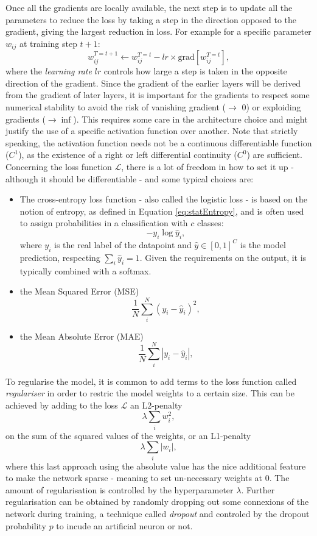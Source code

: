 Once all the gradients are locally available, the next step is to update all the parameters to reduce the loss by taking a step in the direction opposed to the gradient, giving the largest reduction in loss. For example for a specific parameter $w_{ij}$ at training step $t+1$:
\begin{equation}\label{eq:gradientdescent}
    w^{T=t+1}_{ij} \leftarrow w^{T=t}_{ij} - lr \times \text{grad}\left[w^{T=t}_{ij}\right],
\end{equation}
where the \textit{learning rate} $lr$ controls how large a step is taken in the opposite direction of the gradient. Since the gradient of the earlier layers will be derived from the gradient of later layers, it is important for the gradients to respect some numerical stability to avoid the risk of vanishing gradient ($\rightarrow$ 0) or exploiding gradients ($\rightarrow \inf$). This requires some care in the architecture choice and might justify the use of a specific activation function over another. Note that strictly speaking, the activation function needs not be a continuous differentiable function ($C^1$), as the existence of a right or left differential continuity ($C^0$) are sufficient. \\
Concerning the loss function $\mathcal{L}$, there is a lot of freedom in how to set it up - although it should be differentiable - and some typical choices are:
\begin{itemize}
    \item The cross-entropy loss function - also called the logistic loss - is based on the notion of entropy, as defined in Equation \ref{eq:statEntropy}, and is often used to assign probabilities in a classification with $c$ classes: \[ -y_i \log\hat{y}_i,\] where $y_i$ is the real label of the datapoint and $\hat{y} \in [0, 1]^C$ is the model prediction, respecting $\sum_i \hat{y}_i = 1$. Given the requirements on the output, it is typically combined with a softmax. 
    \item the Mean Squared Error (MSE) \[\frac{1}{N}\sum_i^N (y_i - \hat{y}_i)^2,\] 
    \item the Mean Absolute Error (MAE) \[\frac{1}{N}\sum_i^N |y_i - \hat{y}_i|,\]
\end{itemize} 
To regularise the model, it is common to add terms to the loss function called \textit{regulariser} in order to restric the model weights to a certain size. This can be achieved by adding to the loss $\mathcal{L}$ an L2-penalty \[\lambda \sum_i w_i^2,\] on the sum of the squared values of the weights, or an L1-penalty \[\lambda \sum_i |w_i|,\] where this last approach using the absolute value has the nice additional feature to make the network sparse - meaning to set un-necessary weights at 0. The amount of regularisation is controlled by the hyperparameter $\lambda$. Further regularisation can be obtained by randomly dropping out some connexions of the network during training, a technique called \textit{dropout} and controled by the dropout probability $p$ to incude an artificial neuron or not.\\
